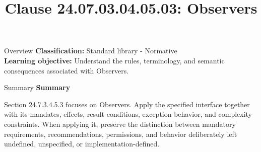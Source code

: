 \documentclass[10pt,letterpaper]{article}
\title{Clause 24.07.03.04.05.03: Observers}
\author{}
\date{}
\begin{document}
\maketitle
\begin{CornellOverviewBox}{Overview}
\textbf{Classification:} Standard library - Normative\\[2pt]
\textbf{Learning objective:} Understand the rules, terminology, and semantic consequences associated with Observers.
\end{CornellOverviewBox}\begin{CornellSummaryBox}{Summary}
{\sffamily\bfseries\color{Accent} Summary}\par\vspace{3pt}Section 24.7.3.4.5.3 focuses on Observers. Apply the specified interface together with its mandates, effects, result conditions, exception behavior, and complexity constraints. When applying it, preserve the distinction between mandatory requirements, recommendations, permissions, and behavior deliberately left undefined, unspecified, or implementation-defined.
\end{CornellSummaryBox}
\end{document}
